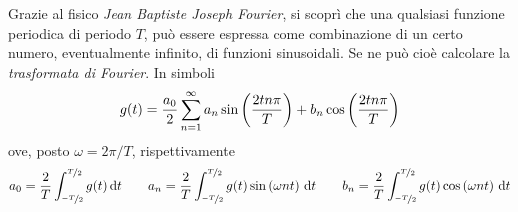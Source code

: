 \documentclass{subfiles}
\begin{document}
Grazie al fisico \emph{Jean Baptiste Joseph Fourier}, si scoprì che una qualsiasi funzione periodica di periodo \(T\),
può essere espressa come combinazione di un certo numero, eventualmente infinito, di funzioni sinusoidali.
Se ne può cioè calcolare la \emph{trasformata di Fourier}. In simboli
\begin{equation}
    g(t) = \frac{a_{0}}{2} \sum*[n = 1][\infty]{a_{n} \sin{\frac{2tn\pi}{T}} + b_{n} \cos{\frac{2tn\pi}{T}}} \\
\end{equation}
ove, posto \(\omega = 2\pi / T\), rispettivamente
\[
    a_{0} = \frac{2}{T} \int[\nicefrac{-T}{2}][\nicefrac{T}{2}]{g(t)}{t}                 \qquad
    a_{n} = \frac{2}{T} \int[\nicefrac{-T}{2}][\nicefrac{T}{2}]{g(t) \sin{\omega nt}}{t} \qquad
    b_{n} = \frac{2}{T} \int[\nicefrac{-T}{2}][\nicefrac{T}{2}]{g(t) \cos{\omega nt}}{t}
\]
\end{document}
